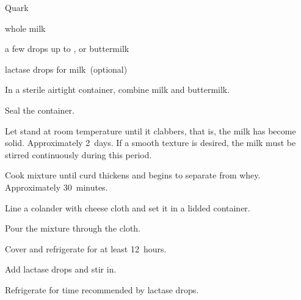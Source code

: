 \begin{recipe}{Quark}{}{}

\begin{ingredients}
\item {} whole milk
\item a few drops up to \C{\half} , or buttermilk 
\item lactase drops for  milk~(optional)
\end{ingredients}

\begin{directions}
\item In a sterile airtight container, combine milk and buttermilk.
\item Seal the container.
\item Let stand at room temperature until it clabbers, that is, the milk has become solid. Approximately 2~days. If a smooth texture is desired, the milk must be stirred continuously during this period.
\item Cook mixture until curd thickens and begins to separate from whey. Approximately 30~minutes.
\item Line a colander with cheese cloth and set it in a lidded container.
\item Pour the mixture through the cloth.
\item Cover and refrigerate for at least 12~hours.
\item Add lactase drops and stir in.
\item Refrigerate for time recommended by lactase drops.
\end{directions}
\end{recipe}
